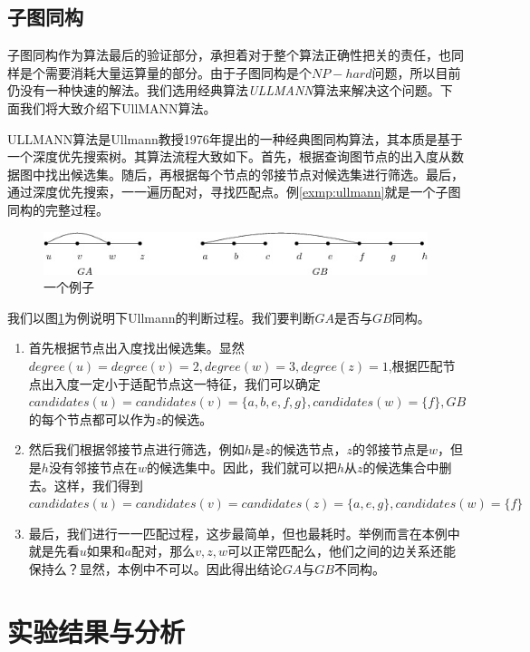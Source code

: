 \documentclass{XDBAthesis}
\numberwithin{algorithm}{chapter}
\begin{document}
\subsection{子图同构}
子图同构作为算法最后的验证部分，承担着对于整个算法正确性把关的责任，也同样是个需要消耗大量运算量的部分。由于子图同构是个$NP-hard$问题，所以目前仍没有一种快速的解法。我们选用经典算法\emph{ULLMANN}算法\cite{ullmann}来解决这个问题。下面我们将大致介绍下UllMANN算法。

ULLMANN算法是Ullmann教授1976年提出的一种经典图同构算法，其本质是基于一个深度优先搜索树。其算法流程大致如下。首先，根据查询图节点的出入度从数据图中找出候选集。随后，再根据每个节点的邻接节点对候选集进行筛选。最后，通过深度优先搜索，一一遍历配对，寻找匹配点。例\ref{exmp:ullmann}就是一个子图同构的完整过程。
\begin{figure}[htb]
    \centering
    \includegraphics[width=\textwidth ]{../figures/ulle}
    \caption{一个例子}
    \label{fg:ullman}
\end{figure}
\begin{exmp}
    我们以图\ref{fg:ullman}为例说明下Ullmann的判断过程。我们要判断$GA$是否与$GB$同构。
    \begin{enumerate}
        \item 首先根据节点出入度找出候选集。显然$degree(u)=degree(v)=2,degree(w)=3,degree(z)=1$,根据匹配节点出入度一定小于适配节点这一特征，我们可以确定$candidates(u)=candidates(v)=\{a,b,e,f,g\},candidates(w)=\{f\},GB$的每个节点都可以作为$z$的候选。
        \item 然后我们根据邻接节点进行筛选，例如$h$是$z$的候选节点，$z$的邻接节点是$w$，但是$h$没有邻接节点在$w$的候选集中。因此，我们就可以把$h$从$z$的候选集合中删去。这样，我们得到$candidates(u)=candidates(v)=candidates(z)=\{a,e,g\},candidates(w)=\{f\}$
        \item 最后，我们进行一一匹配过程，这步最简单，但也最耗时。举例而言在本例中就是先看$u$如果和$a$配对，那么$v,z,w$可以正常匹配么，他们之间的边关系还能保持么？显然，本例中不可以。因此得出结论$GA$与$GB$不同构。
    \end{enumerate}
    \label{exmp:ullmann}    
\end{exmp}


\section{实验结果与分析}
\end{document}
